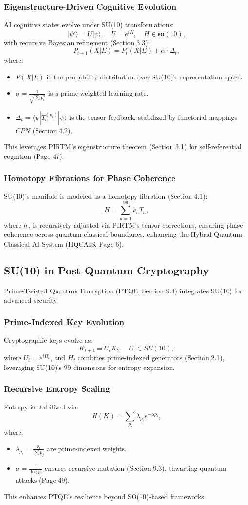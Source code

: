 \documentclass{article}
\theoremstyle{plain}
\begin{document}
\subsubsection{Eigenstructure-Driven Cognitive Evolution}
AI cognitive states evolve under SU(10) transformations:
\[
|\psi'\rangle = U |\psi\rangle, \quad U = e^{i H}, \quad H \in \mathfrak{su}(10),
\]
with recursive Bayesian refinement (Section 3.3):
\[
P_{t+1}(X|E) = P_t(X|E) + \alpha \cdot \Delta_t,
\]
where:
\begin{itemize}
    \item \( P(X|E) \) is the probability distribution over SU(10)’s representation space.
    \item \( \alpha = \frac{1}{\sqrt{\sum p_i^2}} \) is a prime-weighted learning rate.
    \item \( \Delta_t = \langle \psi | T_a^{(p_i)} | \psi \rangle \) is the tensor feedback, stabilized by functorial mappings \( CPN \) (Section 4.2).
\end{itemize}
This leverages PIRTM’s eigenstructure theorem (Section 3.1) for self-referential cognition (Page 47).

\subsubsection{Homotopy Fibrations for Phase Coherence}
SU(10)’s manifold is modeled as a homotopy fibration (Section 4.1):
\[
H = \sum_{a=1}^{99} h_a T_a,
\]
where \( h_a \) is recursively adjusted via PIRTM’s tensor corrections, ensuring phase coherence across quantum-classical boundaries, enhancing the Hybrid Quantum-Classical AI System (HQCAIS, Page 6).

\subsection{SU(10) in Post-Quantum Cryptography}

Prime-Twisted Quantum Encryption (PTQE, Section 9.4) integrates SU(10) for advanced security.

\subsubsection{Prime-Indexed Key Evolution}
Cryptographic keys evolve as:
\[
K_{t+1} = U_t K_t, \quad U_t \in SU(10),
\]
where \( U_t = e^{i H_t} \), and \( H_t \) combines prime-indexed generators (Section 2.1), leveraging SU(10)’s 99 dimensions for entropy expansion.

\subsubsection{Recursive Entropy Scaling}
Entropy is stabilized via:
\[
H(K) = \sum_{p_i} \lambda_{p_i} e^{-\alpha p_i},
\]
where:
\begin{itemize}
    \item \( \lambda_{p_i} = \frac{p_i}{\sum p_j} \) are prime-indexed weights.
    \item \( \alpha = \frac{1}{\log p_i} \) ensures recursive mutation (Section 9.3), thwarting quantum attacks (Page 49).
\end{itemize}
This enhances PTQE’s resilience beyond SO(10)-based frameworks.
\end{document}
